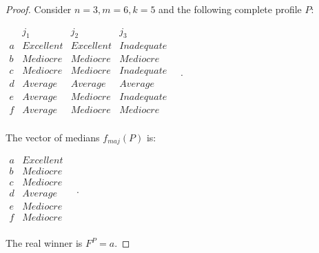 \documentclass[version=3.21, pagesize, twoside=off, bibliography=totoc, DIV=calc, fontsize=12pt, a4paper]{scrartcl}
\begin{document}
\begin{proof} Consider $n=3, m=6, k=5$ and the following complete profile $P$:
	\begin{center}
		$
		\begin{array}{cccc}
			  & j_1 & j_2 & j_3 \\
			a &	Excellent	& Excellent & Inadequate\\
			b &	Mediocre	& Mediocre	& Mediocre\\
			c &	Mediocre	& Mediocre & Inadequate\\
			d &	Average	& Average	& Average\\
			e &	Average	& Mediocre	& Inadequate \\
			f &	Average	& Mediocre & Mediocre	  \\
		\end{array} \quad.
		$
	\end{center}
	The vector of medians $f_{maj}(P)$ is:
	\begin{center}
		$
		\begin{array}{cc}
			a &	Excellent \\
			b &	Mediocre \\
			c &	Mediocre \\
			d &	Average	\\
			e &	Mediocre \\
			f & Mediocre \\
		\end{array} \quad.
		$
	\end{center}
	The real winner is $F^P=a$. 
	

\end{proof}
\end{document}
